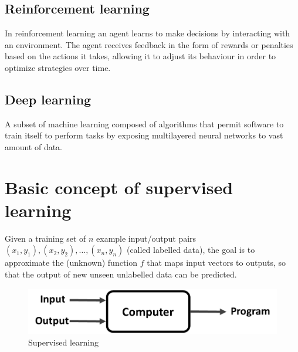 \documentclass[a4paper,12pt,answers]{article}
\begin{document}
	\subsection{Reinforcement learning}
	In reinforcement learning an agent learns to make decisions by interacting with an environment. The agent receives feedback in the form of rewards or penalties based on the actions it takes, allowing it to adjust its behaviour in order to optimize strategies over time.
	
	\subsection{Deep learning}
	A subset of machine learning composed of algorithms that permit software to train itself to perform tasks by exposing multilayered neural networks to vast amount of data.


	
	\section{Basic concept of supervised learning}
	Given a training set of $n$ example input/output pairs $(x_1,y_1), (x_2,y_2), \dots, (x_n, y_n)$ (called labelled data), the goal is to approximate the (unknown) function $f$ that maps input vectors to outputs, so that the output of new unseen unlabelled data can be predicted.
	
	\begin{figure}[H]
		\centering
		\includegraphics[width=0.7\linewidth]{supervised_learning}
		\caption{Supervised learning}
		\label{fig:supervisedlearning}
	\end{figure}
	
	
	
\end{document}
